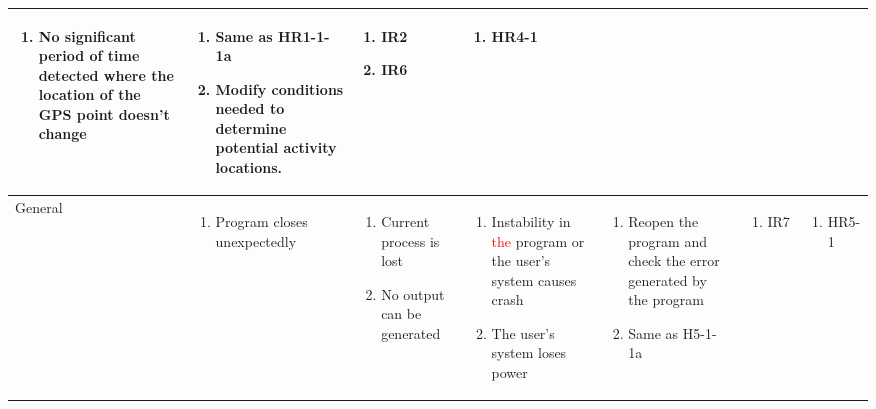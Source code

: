 \documentclass{article}
\begin{document}
\begin{landscape}
\begin{longtable}{|p{2.5cm}|p{3.5cm}|p{3.5cm}|p{3.5cm}|p{5.5cm}|p{1.8cm}|p{2cm}|}
\begin{enumerate}[label=1\alph*.]
    \item No significant period of time detected where the location of the GPS point doesn't change
\end{enumerate}
&
\begin{enumerate}[label=1\alph*.]
    \item Same as HR1-1-1a
    \item Modify conditions needed to determine potential activity locations.
\end{enumerate}
& 
\begin{enumerate}[label=1\alph*.]
    \item IR2
    \item IR6
\end{enumerate}
&
 \begin{enumerate}
     \item HR4-1
 \end{enumerate}\\
\hline
General
& 
\begin{enumerate}
    \item Program closes unexpectedly
\end{enumerate}
& 
\begin{enumerate}[label=1\alph*.]
    \item Current process is lost
    \item No output can be generated
\end{enumerate}
& 
\begin{enumerate}[label=1\alph*.]
    \item Instability in \textcolor{red}{the} program or the user's system causes crash
    \item The user's system loses power
\end{enumerate}
&
\begin{enumerate}[label=1\alph*.]
    \item Reopen the program and check the error generated by the program
    \item Same as H5-1-1a
\end{enumerate}
&
\begin{enumerate}[label=1\alph*.]
    \item IR7
\end{enumerate}
&
 \begin{enumerate}
     \item HR5-1
 \end{enumerate}\\
\hline
\end{longtable}
\end{landscape}
\restoregeometry
\newpage
\end{document}
